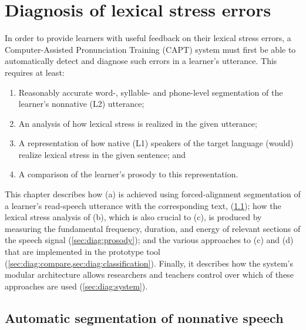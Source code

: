%
%
\chapter{Diagnosis of lexical stress errors}
\label{chap:diagnosis}


In order to provide learners with useful feedback on their lexical stress errors, %
a Computer-Assisted Pronunciation Training (CAPT) system
must first be able to automatically detect and diagnose such errors in a learner's utterance. This requires at least:
\begin{enumerate}[label=(\alph*),topsep=-.5em]
\item Reasonably accurate word-, syllable- and phone-level segmentation of the learner's nonnative (L2) utterance; 
\item %
An analysis of how lexical stress is realized in the
given
utterance;
\item A representation of how native (L1) speakers of the target language (would) realize lexical stress in the given sentence; and
\item %
A comparison of the learner's prosody to this representation. 
\end{enumerate}

This chapter describes 
%
how (a) is achieved using
 forced-alignment segmentation of a learner's read-speech utterance with the corresponding text, 
 (\cref{sec:diag:segmentation}); 
 how the lexical stress analysis of (b), which is also crucial to (c), is produced by measuring the fundamental frequency, duration, and energy of relevant sections of the speech signal (\cref{sec:diag:prosody}); 
 and 
 the various approaches to (c) and (d) that are implemented in the prototype tool (\cref{sec:diag:compare,sec:diag:classification}).
 Finally, it describes how the system's modular architecture allows researchers and teachers control over which of these approaches are used (\cref{sec:diag:system}).



\section{Automatic segmentation of nonnative speech}
\label{sec:diag:segmentation}

